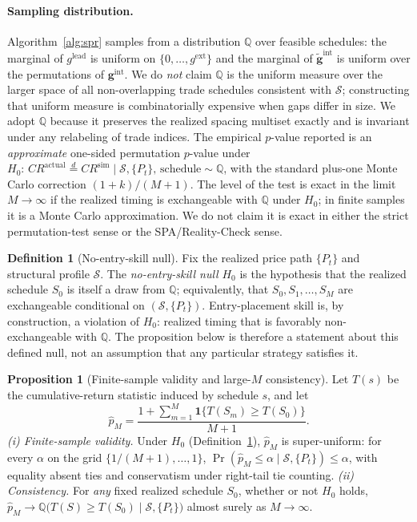 \documentclass[preprint,12pt]{elsarticle}
\theoremstyle{definition}
\newtheorem{proposition}{Proposition}
\newtheorem{definition}{Definition}
\begin{document}
\paragraph{Sampling distribution.} Algorithm~\ref{alg:spr} samples from a distribution $\mathbb{Q}$ over feasible schedules: the marginal of $g^{\mathrm{lead}}$ is uniform on $\{0,\ldots,g^{\mathrm{ext}}\}$ and the marginal of $\tilde{\mathbf{g}}^{\mathrm{int}}$ is uniform over the permutations of $\mathbf{g}^{\mathrm{int}}$. We do \emph{not} claim $\mathbb{Q}$ is the uniform measure over the larger space of all non-overlapping trade schedules consistent with $\mathcal{S}$; constructing that uniform measure is combinatorially expensive when gaps differ in size. We adopt $\mathbb{Q}$ because it preserves the realized spacing multiset exactly and is invariant under any relabeling of trade indices. The empirical $p$-value reported is an \emph{approximate} one-sided permutation $p$-value under $H_0:\,CR^{\mathrm{actual}}\stackrel{d}{=}CR^{\mathrm{sim}}\mid \mathcal{S}, \{P_t\},\,\text{schedule}\sim\mathbb{Q}$, with the standard plus-one Monte Carlo correction $(1+k)/(M+1)$. The level of the test is exact in the limit $M\to\infty$ if the realized timing is exchangeable with $\mathbb{Q}$ under $H_0$; in finite samples it is a Monte Carlo approximation. We do not claim it is exact in either the strict permutation-test sense or the SPA/Reality-Check sense.

\begin{definition}[No-entry-skill null]
\label{def:h0}
Fix the realized price path $\{P_t\}$ and structural profile $\mathcal{S}$. The \emph{no-entry-skill null} $H_0$ is the hypothesis that the realized schedule $S_0$ is itself a draw from $\mathbb{Q}$; equivalently, that $S_0,S_1,\ldots,S_M$ are exchangeable conditional on $(\mathcal{S},\{P_t\})$. Entry-placement skill is, by construction, a violation of $H_0$: realized timing that is favorably non-exchangeable with $\mathbb{Q}$. The proposition below is therefore a statement about this defined null, not an assumption that any particular strategy satisfies it.
\end{definition}

\begin{proposition}[Finite-sample validity and large-$M$ consistency]
\label{prop:q-validity}
Let $T(s)$ be the cumulative-return statistic induced by schedule $s$, and let
\[
\hat p_M=\frac{1+\sum_{m=1}^{M}\mathbf{1}\{T(S_m)\ge T(S_0)\}}{M+1}.
\]
\emph{(i) Finite-sample validity.} Under $H_0$ (Definition~\ref{def:h0}), $\hat p_M$ is super-uniform: for every $\alpha$ on the grid $\{1/(M+1),\ldots,1\}$, $\Pr(\hat p_M\le\alpha\mid\mathcal{S},\{P_t\})\le\alpha$, with equality absent ties and conservatism under right-tail tie counting. \emph{(ii) Consistency.} For \emph{any} fixed realized schedule $S_0$, whether or not $H_0$ holds, $\hat p_M\to\mathbb{Q}\big(T(S)\ge T(S_0)\mid\mathcal{S},\{P_t\}\big)$ almost surely as $M\to\infty$.
\end{proposition}
\end{document}
